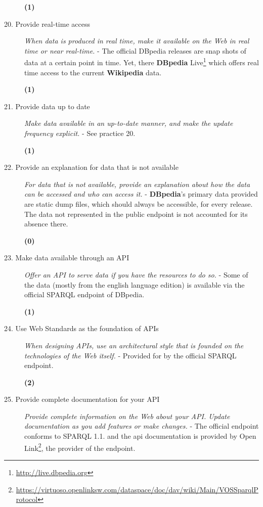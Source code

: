 \documentclass[a4paper,english,twoside,BCOR1.5cm,headsepline,DIV12,appendixprefix,final,12pt]{scrbook}
\newcommand{\dbpedia}{{\ttfamily\bfseries DBpedia}\xspace}
\newcommand{\wikipedia}{{\ttfamily\bfseries Wikipedia}\xspace}
\newcommand\footnoteurl[1]{\footnote{\scriptsize\url{#1}}}
\begin{document}
\begin{description}
\begin{flushright}\color{BurntOrange}\textbf{(1)}\end{flushright}
 \item[20. Provide real-time access] \textit{When data is produced in real time, make it available on the Web in real time or near real-time.} - The official DBpedia releases are snap shots of data at a certain point in time. Yet, there \dbpedia Live\footnoteurl{http://live.dbpedia.org} which offers real time access to the current \wikipedia data.
\begin{flushright}\color{BurntOrange}\textbf{(1)}\end{flushright}
 \item[21. Provide data up to date] \textit{Make data available in an up-to-date manner, and make the update frequency explicit.} - See practice 20.
\begin{flushright}\color{BurntOrange}\textbf{(1)}\end{flushright}
 \item[22. Provide an explanation for data that is not available] \textit{For data that is not available, provide an explanation about how the data can be accessed and who can access it.} - \dbpedia{}'s primary data provided are static dump files, which should always be accessible, for every release. The data not represented in the public endpoint is not accounted for its absence there.
\begin{flushright}\color{Mahogany}\textbf{(0)}\end{flushright}
 \item[23. Make data available through an API] \textit{Offer an API to serve data if you have the resources to do so.} - Some of the data (mostly from the english language edition) is available via the official SPARQL endpoint of DBpedia.
\begin{flushright}\color{BurntOrange}\textbf{(1)}\end{flushright}
 \item[24. Use Web Standards as the foundation of APIs] \textit{When designing APIs, use an architectural style that is founded on the technologies of the Web itself.} - Provided for by the official SPARQL endpoint.
\begin{flushright}\color{ForestGreen}\textbf{(2)}\end{flushright}
 \item[25. Provide complete documentation for your API] \textit{Provide complete information on the Web about your API. Update documentation as you add features or make changes.} - The official endpoint conforms to SPARQL 1.1. and the api documentation is provided by Open Link\footnoteurl{https://virtuoso.openlinksw.com/dataspace/doc/dav/wiki/Main/VOSSparqlProtocol}, the provider of the endpoint.

\end{description}
\end{document}
